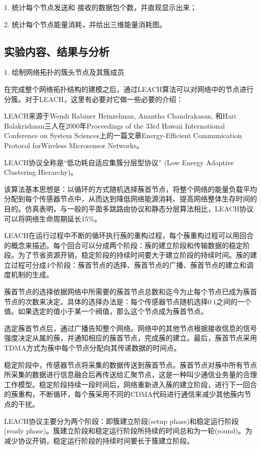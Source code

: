 \documentclass[UTF8]{article} %
\begin{document}
	1.	统计每个节点发送和 接收的数据包个数，并直观显示出来；
	
	2. 统计每个节点能量消耗，并给出三维能量消耗图。

	\subsection{实验内容、结果与分析}
	1. 绘制网络拓扑的簇头节点及其簇成员
	
	在完成整个网络拓扑结构的建模之后，通过LEACH算法可以对网络中的节点进行分簇。对于LEACH，这里有必要对它做一些必要的介绍：
	
	 LEACH来源于Wendi Rabiner Heinzelman, Anantha Chandrakasan, 和Hari Balakrishnan三人在2000年Proceedings of the 33rd Hawaii International Conference on System Sciences上的一篇文章Energy-Efficient Communication Protocol forWireless Microsensor Networks。
	 
	 LEACH协议全称是“低功耗自适应集簇分层型协议” (Low Energy Adaptive Clustering Hierarchy)。
	  
	 该算法基本思想是：以循环的方式随机选择蔟首节点，将整个网络的能量负载平均分配到每个传感器节点中，从而达到降低网络能源消耗、提高网络整体生存时间的目的。仿真表明，与一般的平面多跳路由协议和静态分层算法相比，LEACH协议可以将网络生命周期延长15\%。
	  
	 LEACH在运行过程中不断的循环执行蔟的重构过程，每个蔟重构过程可以用回合的概念来描述。每个回合可以分成两个阶段：蔟的建立阶段和传输数据的稳定阶段。为了节省资源开销，稳定阶段的持续时间要大于建立阶段的持续时间。蔟的建立过程可分成4个阶段：蔟首节点的选择、蔟首节点的广播、蔟首节点的建立和调度机制的生成。
	  
	 蔟首节点的选择依据网络中所需要的蔟首节点总数和迄今为止每个节点已成为蔟首节点的次数来决定。具体的选择办法是：每个传感器节点随机选择$0~1$之间的一个值。如果选定的值小于某一个阀值，那么这个节点成为蔟首节点。
	  
	 选定蔟首节点后，通过广播告知整个网络。网络中的其他节点根据接收信息的信号强度决定从属的蔟，并通知相应的蔟首节点，完成蔟的建立。最后，蔟首节点采用TDMA方式为蔟中每个节点分配向其传递数据的时间点。
	  
	 稳定阶段中，传感器节点将采集的数据传送到蔟首节点。蔟首节点对蔟中所有节点所采集的数据进行信息融合后再传送给汇聚节点，这是一种叫少通信业务量的合理工作模型。稳定阶段持续一段时间后，网络重新进入蔟的建立阶段，进行下一回合的蔟重构，不断循环，每个蔟采用不同的CDMA代码进行通信来减少其他蔟内节点的干扰。
	  
	 LEACH协议主要分为两个阶段：即簇建立阶段(setup phase)和稳定运行阶段(ready phase)。簇建立阶段和稳定运行阶段所持续的时间总和为一轮(round)。为减少协议开销，稳定运行阶段的持续时间要长于簇建立阶段。
	  
\end{document}
